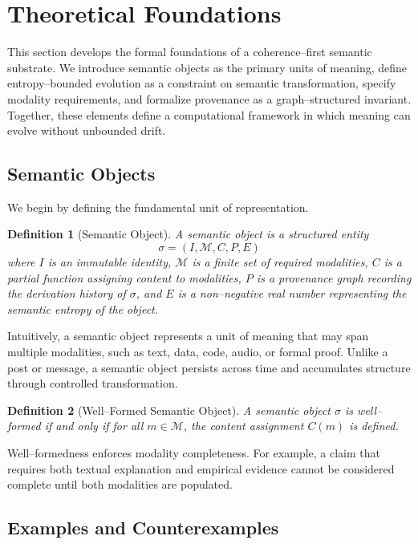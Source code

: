 \documentclass[11pt]{article}
\newtheorem{definition}{Definition}
\begin{document}
\section{Theoretical Foundations}

This section develops the formal foundations of a coherence--first semantic substrate.
We introduce semantic objects as the primary units of meaning, define entropy--bounded
evolution as a constraint on semantic transformation, specify modality requirements, and
formalize provenance as a graph--structured invariant. Together, these elements define a
computational framework in which meaning can evolve without unbounded drift.

\subsection{Semantic Objects}

We begin by defining the fundamental unit of representation.

\begin{definition}[Semantic Object]
A \emph{semantic object} is a structured entity
\[
\sigma = (I, \mathcal{M}, C, P, E)
\]
where $I$ is an immutable identity, $\mathcal{M}$ is a finite set of required modalities,
$C$ is a partial function assigning content to modalities, $P$ is a provenance graph
recording the derivation history of $\sigma$, and $E$ is a non--negative real number
representing the semantic entropy of the object.
\end{definition}

Intuitively, a semantic object represents a unit of meaning that may span multiple
modalities, such as text, data, code, audio, or formal proof. Unlike a post or message, a
semantic object persists across time and accumulates structure through controlled
transformation.

\begin{definition}[Well--Formed Semantic Object]
A semantic object $\sigma$ is \emph{well--formed} if and only if for all $m \in
\mathcal{M}$, the content assignment $C(m)$ is defined.
\end{definition}

Well--formedness enforces modality completeness. For example, a claim that requires both
textual explanation and empirical evidence cannot be considered complete until both
modalities are populated.

\subsection{Examples and Counterexamples}
\end{document}

